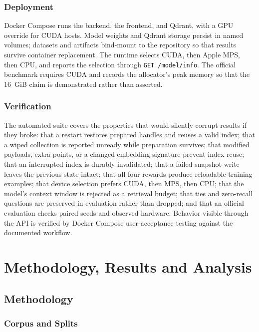 \documentclass[12pt,letterpaper,oneside]{report}
\newcommand{\code}[1]{\texttt{\small #1}}
\begin{document}
\subsection{Deployment}

Docker Compose runs the backend, the frontend, and Qdrant, with a GPU override
for CUDA hosts. Model weights and Qdrant storage persist in named volumes;
datasets and artifacts bind-mount to the repository so that results survive
container replacement. The runtime selects CUDA, then Apple MPS, then CPU, and
reports the selection through \code{GET /model/info}. The official benchmark
requires CUDA and records the allocator's peak memory so that the 16~GiB claim
is demonstrated rather than asserted.

\subsection{Verification}

The automated suite covers the properties that would silently corrupt results
if they broke: that a restart restores prepared handles and reuses a valid
index; that a wiped collection is reported unready while preparation survives;
that modified payloads, extra points, or a changed embedding signature prevent
index reuse; that an interrupted index is durably invalidated; that a failed
snapshot write leaves the previous state intact; that all four rewards produce
reloadable training examples; that device selection prefers CUDA, then MPS,
then CPU; that the model's context window is rejected as a retrieval budget;
that ties and zero-recall questions are preserved in evaluation rather than
dropped; and that an official evaluation checks paired seeds and observed
hardware. Behavior visible through the API is verified by Docker Compose
user-acceptance testing against the documented workflow.

\chapter{Methodology, Results and Analysis}
\label{ch:methodology}

\section{Methodology}
\label{sec:methodology}

\subsection{Corpus and Splits}
\label{sec:corpus}
\end{document}
